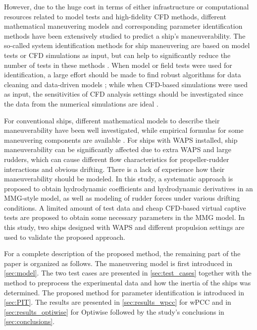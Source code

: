 However, due to the huge cost in terms of either infrastructure or computational resources related to model tests and high-fidelity CFD methods, different mathematical maneuvering models and corresponding parameter identification methods have been extensively studied to predict a ship’s maneuverability. The so-called system identification methods for ship maneuvering are based on model tests or CFD simulations as input, but can help to significantly reduce the number of tests in these methods \citep{lokukalugep.pereraSystemIdentificationVessel2016,alexanderssonSystemIdentificationPhysicsinformed2024b}. When model or field tests were used for identification, a large effort should be made to find robust algorithms for data cleaning and data-driven models \citep{revestidoherreroTwostepIdentificationNonlinear2012,alexanderssonSystemIdentificationVessel2022,duShipManeuveringPrediction2022}; while when CFD-based simulations were used as input, the sensitivities of CFD analysis settings should be investigated since the data from the numerical simulations are ideal \citep{liuPredictionsShipManeuverability2018}.

For conventional ships, different mathematical models to describe their maneuverability have been well investigated, while empirical formulas for some maneuvering components are available \citep{yasukawaIntroductionMMGStandard2015}. For ships with WAPS installed, ship maneuverability can be significantly affected due to extra WAPS and large rudders, which can cause different flow characteristics for propeller-rudder interactions and obvious drifting. There is a lack of experience how their maneuverability should be modeled. In this study, a systematic approach is proposed to obtain hydrodynamic coefficients and hydrodynamic derivatives in an MMG-style model, as well as modeling of rudder forces under various drifting conditions. A limited amount of test data and cheap CFD-based virtual captive tests are proposed to obtain some necessary parameters in the MMG model. In this study, two ships designed with WAPS and different propulsion settings are used to validate the proposed approach. 

For a complete description of the proposed method, the remaining part of the paper is organized as follows. 
The maneuvering model is first introduced in \autoref{sec:model}. The two test cases are presented in \autoref{sec:test_cases} together with the method to preprocess the experimental data and how the inertia of the ships was determined. The proposed method for parameter identification is introduced in \autoref{sec:PIT}. The results are presented in \autoref{sec:results_wpcc} for wPCC and in \autoref{sec:results_optiwise} for Optiwise followed by the study's conclusions in \autoref{sec:conclusions}.


